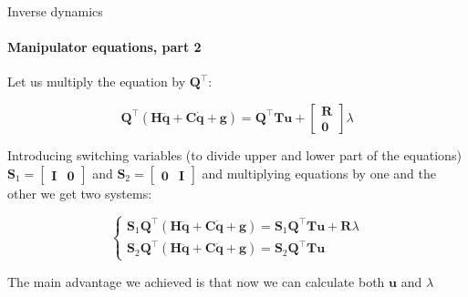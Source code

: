 \documentclass{beamer}
\begin{document}
\begin{frame}{Inverse dynamics}
\framesubtitle{Manipulator equations, part 2}
\begin{flushleft}

Let us multiply the equation by $\mathbf{Q}^\top$:

\begin{equation}
    \mathbf{Q}^\top (\mathbf{H}\ddot{\mathbf{q}} + \mathbf{C}\dot{\mathbf{q}} + \mathbf{g}) = \mathbf{Q}^\top\mathbf{T}\mathbf{u} + \begin{bmatrix} \mathbf{R} \\ \mathbf{0}  \end{bmatrix} \lambda
\end{equation}

Introducing switching variables (to divide upper and lower part of the equations) $\mathbf{S}_1 = \begin{bmatrix} \mathbf{I} & \mathbf{0}  \end{bmatrix}$ and $\mathbf{S}_2 = \begin{bmatrix} \mathbf{0} & \mathbf{I}  \end{bmatrix}$ and multiplying equations by one and the other we get two systems:

\begin{equation}
\begin{cases}
    \mathbf{S}_1 \mathbf{Q}^\top (\mathbf{H}\ddot{\mathbf{q}} + \mathbf{C}\dot{\mathbf{q}} + \mathbf{g}) = \mathbf{S}_1\mathbf{Q}^\top\mathbf{T}\mathbf{u} + \mathbf{R} \lambda \\
    \mathbf{S}_2 \mathbf{Q}^\top (\mathbf{H}\ddot{\mathbf{q}} + \mathbf{C}\dot{\mathbf{q}} + \mathbf{g}) = \mathbf{S}_2\mathbf{Q}^\top\mathbf{T}\mathbf{u}
\end{cases}
\end{equation}

The main advantage we achieved is that now we can calculate both $\mathbf{u}$ and $\lambda$

\end{flushleft}
\end{frame}
\end{document}
